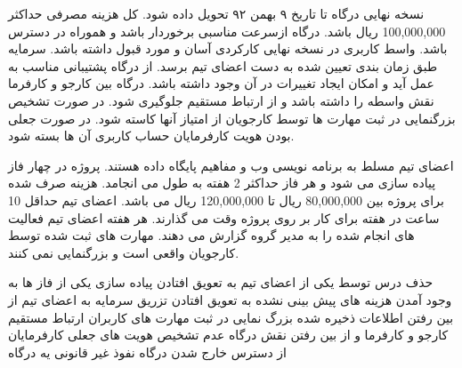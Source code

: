  نسخه نهایی درگاه تا تاریخ ۹ بهمن ۹۲ تحویل داده شود.
 کل هزینه مصرفی حداکثر 100,000,000 ریال باشد.
 درگاه ازسرعت مناسبی برخوردار باشد  و هموراه در دسترس باشد. 
 واسط کاربری در نسخه نهایی کارکردی آسان  و مورد قبول داشته باشد.
 سرمایه طبق زمان بندی تعیین شده به دست اعضای تیم برسد.
 از درگاه پشتیبانی مناسب به عمل آید و امکان ایجاد تغییرات در آن وجود داشته باشد. 
 درگاه بین کارجو و کارفرما نقش واسطه را داشته باشد و از ارتباط مستقیم جلوگیری شود.
 در صورت تشخیص بزرگنمایی در ثبت مهارت ها توسط کارجویان از امتیاز آنها کاسته شود. 
 در صورت جعلی بودن هویت کارفرمایان حساب کاربری آن ها بسته شود.

 اعضای تیم مسلط به برنامه نویسی وب و مفاهیم پایگاه داده هستند.
 پروژه در چهار فاز پیاده سازی می شود و هر فاز حداکثر 2 هفته به طول می انجامد.
 هزینه صرف شده برای پروژه بین 80,000,000 ریال تا 120,000,000 ریال می باشد.
 اعضای تیم حداقل 10 ساعت در هفته برای کار بر روی پروژه وقت می گذارند.
 هر هفته اعضای تیم فعالیت های انجام شده را به مدیر گروه گزارش می دهند.
 مهارت های ثبت شده توسط کارجویان واقعی است و بزرگنمایی نمی کنند.

 حذف درس توسط یکی از اعضای تیم
 به تعویق افتادن پیاده سازی یکی از فاز ها 
  به وجود  آمدن هزینه های پیش بینی نشده
 به تعویق افتادن تزریق سرمایه به اعضای تیم
 از بین رفتن اطلاعات ذخیره شده
 بزرگ نمایی در ثبت مهارت های کاربران
 ارتباط مستقیم کارجو و کارفرما و از بین رفتن نقش درگاه
 عدم تشخیص هویت های جعلی کارفرمایان
 از دسترس خارج شدن درگاه
 نفوذ غیر قانونی یه درگاه
